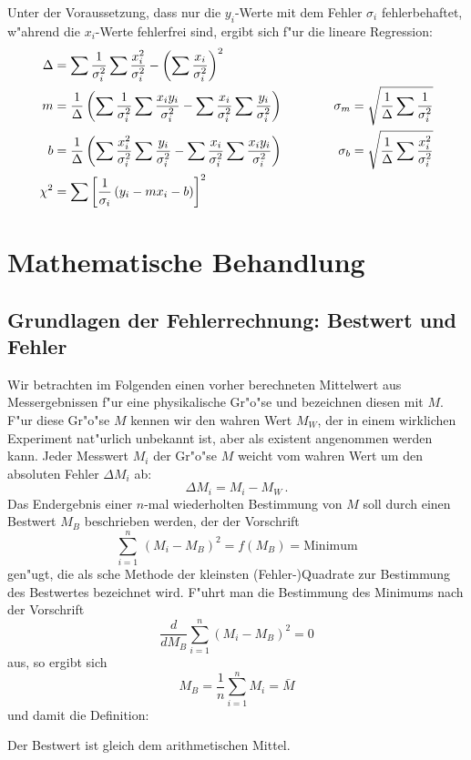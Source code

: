 Unter der Voraussetzung, dass nur die
$y_i$-Werte mit dem Fehler $\sigma_i$ fehlerbehaftet, w"ahrend die
$x_i$-Werte fehlerfrei sind, ergibt sich f"ur die lineare Regression:
\begin{align*}
\Delta&=\sum{\frac{1}{\sigma_i^2}}\sum{\frac{x_i^2}{\sigma_i^2}}-
\left(\sum{\frac{x_i}{\sigma_i^2}}\right)^2 & &
\\
%
m&=\frac{1}{\Delta}\left(\sum{\frac{1}{\sigma_i^2}}
\sum{\frac{x_iy_i}{\sigma_i^2}}-\sum{\frac{x_i}{\sigma_i^2}}\sum{\frac{y_i}{\sigma_i^2}}
\right)
&\sigma_m&=\sqrt{\frac{1}{\Delta}\sum{\frac{1}{\sigma_i^2}}} \\
%
b&=\frac{1}{\Delta}\left(\sum{\frac{x_i^2}{\sigma_i^2}}
\sum{\frac{y_i}{\sigma_i^2}}-\sum{\frac{x_i}{\sigma_i^2}}\sum{\frac{x_iy_i}{\sigma_i^2}}
\right) \hspace{11mm}
&\sigma_b&=\sqrt{\frac{1}{\Delta}\sum{\frac{x_i^2}{\sigma_i^2}}} \\
%
\chi^2&=\sum{\left[\frac{1}{\sigma_i}\left(y_i-mx_i-b\right)\right]^2} & &
\end{align*}


\section{Mathematische Behandlung}

\subsection{Grundlagen der Fehlerrechnung: Bestwert und Fehler}

Wir betrachten im Folgenden einen vorher berechneten Mittelwert
aus Messergebnissen f"ur eine physikalische Gr"o"se und bezeichnen
diesen mit $M$. F"ur diese Gr"o"se $M$ kennen wir den wahren Wert
$M_W$, der in einem wirklichen Experiment nat"urlich unbekannt ist,
aber als existent angenommen werden kann. Jeder Messwert $M_i$ der
Gr"o"se $M$ weicht vom wahren Wert um den absoluten Fehler $\Delta M_i$
ab:
%
\begin{equation} \label{b}
 \Delta M_i = M_i - M_W \, .
\end{equation}
%
Das Endergebnis einer $n$-mal wiederholten Bestimmung von $M$ soll
durch einen Bestwert $M_B$ beschrieben werden, der der Vorschrift
%
\begin{equation} \label{c}
\sum_{i=1}^{n}\, (M_{i} - M_{B})^{2} = f(M_{B}) = \mbox{Minimum}
\end{equation}
%
gen"ugt, die als sche Methode der kleinsten
(Fehler-)Quadrate zur Bestimmung des Bestwertes
bezeichnet wird. F"uhrt man die Bestimmung des Minimums nach der
Vorschrift
%
\begin{equation} \label{d}
 \frac{d}{d M_B} \sum_{i=1}^{n}(M_{i} - M_{B})^{2} = 0
\end{equation}
%
aus, so ergibt sich
%
\begin{equation} \label{e}
 M_{B} = \frac{1}{n} \sum_{i=1}^{n} M_{i} = \bar M
\end{equation}
%
und damit die Definition:
%
\begin{definition} \label{def:bestwert}
  Der Bestwert ist gleich dem arithmetischen Mittel.
\end{definition}

